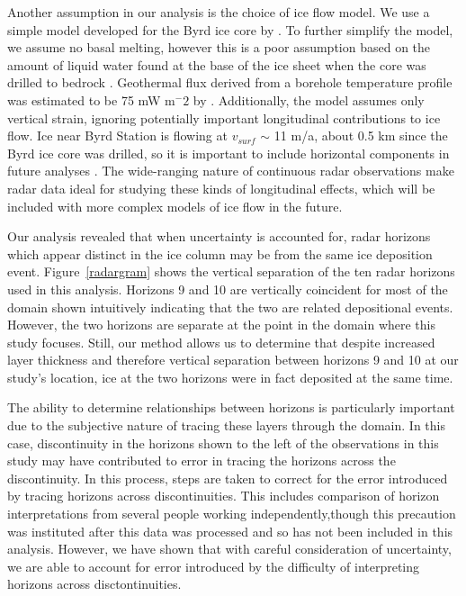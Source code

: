\documentclass[12pt]{article}
\begin{document}
Another assumption in our analysis is the choice of ice flow model. We use a simple model developed for the Byrd ice core by \citet{morland09}. To further simplify the model, we assume no basal melting, however this is a poor assumption based on the amount of liquid water found at the base of the ice sheet when the core was drilled to bedrock \citep{gow68}. Geothermal flux derived from a borehole temperature profile was estimated to be 75 mW m$^-2$ by \citet{gow68}. Additionally, the model assumes only vertical strain, ignoring potentially important longitudinal contributions to ice flow. Ice near Byrd Station is flowing at $v_{surf}$ $\sim$ 11 m/a, about 0.5 km since the Byrd ice core was drilled, so it is important to include horizontal components in future analyses \citep{bindschadler97}. The wide-ranging nature of continuous radar observations make radar data ideal for studying these kinds of longitudinal effects, which will be included with more complex models of ice flow in the future.

Our analysis revealed that when uncertainty is accounted for, radar horizons which appear distinct in the ice column may be from the same ice deposition event. Figure~\ref{radargram} shows the vertical separation of the ten radar horizons used in this analysis. Horizons 9 and 10 are vertically coincident for most of the domain shown  intuitively indicating that the two are related depositional events. However, the two horizons are separate at the point in the domain where this study focuses. Still, our method allows us to determine that despite increased layer thickness and therefore vertical separation between horizons 9 and 10 at our study's location, ice at the two horizons were in fact deposited at the same time.

The ability to determine relationships between horizons is particularly important due to the subjective nature of tracing these layers through the domain. In this case, discontinuity in the horizons shown to the left of the observations in this study may have contributed to error in tracing the horizons across the discontinuity. In this process, steps are taken to correct for the  error introduced by tracing horizons across discontinuities. This includes comparison of horizon interpretations from several people working independently,though this precaution was instituted after this data was processed and so has not been included in this analysis. However, we have shown that with careful consideration of uncertainty, we are able to account for error introduced by the difficulty of interpreting horizons across disctontinuities.
\end{document}
